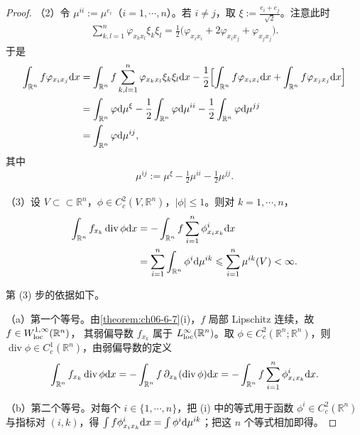 \documentclass[../../main.tex]{subfiles}%
\begin{document}
\begin{proof}
（2）令 $\mu^{ii}:=\mu^{e_i}$（$i=1,\cdots,n$）。若 $i\neq j$，取 $\xi:=\frac{e_i+e_j}{\sqrt2}$。注意此时
\begin{align*}
\sum_{k,l=1}^{n}\varphi_{x_kx_l}\xi_k\xi_l=\frac12\bigl(\varphi_{x_ix_i}+2\varphi_{x_ix_j}+\varphi_{x_jx_j}\bigr).
\end{align*}
于是
\begin{align*}
\int_{\mathbb{R}^n}f\varphi_{x_ix_j}\mathrm{d} x
&=\int_{\mathbb{R}^n}f\sum_{k,l=1}^{n}\varphi_{x_kx_l}\xi_k\xi_l\mathrm{d} x-\frac12\Bigl[\int_{\mathbb{R}^n}f\varphi_{x_ix_i}\mathrm{d} x+\int_{\mathbb{R}^n}f\varphi_{x_jx_j}\mathrm{d} x\Bigr]\\
&=\int_{\mathbb{R}^n}\varphi\mathrm{d}\mu^{\xi}-\frac12\int_{\mathbb{R}^n}\varphi\mathrm{d}\mu^{ii}-\frac12\int_{\mathbb{R}^n}\varphi\mathrm{d}\mu^{jj}\\
&=\int_{\mathbb{R}^n}\varphi\mathrm{d}\mu^{ij},
\end{align*}
其中
\begin{align*}
\mu^{ij}:=\mu^{\xi}-\frac12\mu^{ii}-\frac12\mu^{jj}.
\end{align*}

（3）设 $V\subset\subset\mathbb{R}^n$，$\phi\in C_c^{2}(V,\mathbb{R}^n)$，$\lvert\phi\rvert\leqslant1$。则对 $k=1,\cdots,n$，
\begin{align*}
\int_{\mathbb{R}^n}f_{x_k}\operatorname{div}\phi\mathrm{d} x
&=-\int_{\mathbb{R}^n}f\sum_{i=1}^{n}\phi^{i}_{x_ix_k}\mathrm{d} x\\
&=\sum_{i=1}^{n}\int_{\mathbb{R}^n}\phi^{i}\mathrm{d}\mu^{ik}\leqslant\sum_{i=1}^{n}\mu^{ik}(V)<\infty .
\end{align*}

第 (3) 步的依据如下。

（a）第一个等号。由\cref{theorem:ch06-6-7}(i)，$f$ 局部 Lipschitz 连续，故 $f\in W^{1,\infty}_{\mathrm{loc}}(\mathbb{R}^n)$，%
其弱偏导数 $f_{x_k}$ 属于 $L^{\infty}_{\mathrm{loc}}(\mathbb{R}^n)$。取 $\phi\in C_c^{2}(\mathbb{R}^n;\mathbb{R}^n)$，则 $\operatorname{div}\phi\in C_c^{1}(\mathbb{R}^n)$，由弱偏导数的定义
\begin{align*}
\int_{\mathbb{R}^n}f_{x_k}\operatorname{div}\phi\mathrm{d} x=-\int_{\mathbb{R}^n}f\,\partial_{x_k}(\operatorname{div}\phi)\mathrm{d} x=-\int_{\mathbb{R}^n}f\sum_{i=1}^{n}\phi^{i}_{x_ix_k}\mathrm{d} x .
\end{align*}

（b）第二个等号。对每个 $i\in\{1,\cdots,n\}$，把 (i) 中的等式用于函数 $\phi^{i}\in C_c^{2}(\mathbb{R}^n)$ 与指标对 $(i,k)$，得 $\int f\phi^{i}_{x_ix_k}\mathrm{d} x=\int\phi^{i}\mathrm{d}\mu^{ik}$；把这 $n$ 个等式相加即得。


\end{proof}
\end{document}
